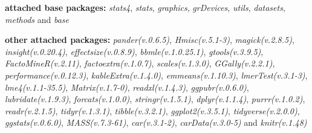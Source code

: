 \documentclass[
  bookmarksnumbered]{article}
\begin{document}
\textbf{attached base packages:}
\emph{stats4}, \emph{stats}, \emph{graphics}, \emph{grDevices}, \emph{utils}, \emph{datasets}, \emph{methods} and \emph{base}

\textbf{other attached packages:}
\emph{pander(v.0.6.5)}, \emph{Hmisc(v.5.1-3)}, \emph{magick(v.2.8.5)}, \emph{insight(v.0.20.4)}, \emph{effectsize(v.0.8.9)}, \emph{bbmle(v.1.0.25.1)}, \emph{gtools(v.3.9.5)}, \emph{FactoMineR(v.2.11)}, \emph{factoextra(v.1.0.7)}, \emph{scales(v.1.3.0)}, \emph{GGally(v.2.2.1)}, \emph{performance(v.0.12.3)}, \emph{kableExtra(v.1.4.0)}, \emph{emmeans(v.1.10.3)}, \emph{lmerTest(v.3.1-3)}, \emph{lme4(v.1.1-35.5)}, \emph{Matrix(v.1.7-0)}, \emph{readxl(v.1.4.3)}, \emph{ggpubr(v.0.6.0)}, \emph{lubridate(v.1.9.3)}, \emph{forcats(v.1.0.0)}, \emph{stringr(v.1.5.1)}, \emph{dplyr(v.1.1.4)}, \emph{purrr(v.1.0.2)}, \emph{readr(v.2.1.5)}, \emph{tidyr(v.1.3.1)}, \emph{tibble(v.3.2.1)}, \emph{ggplot2(v.3.5.1)}, \emph{tidyverse(v.2.0.0)}, \emph{ggstats(v.0.6.0)}, \emph{MASS(v.7.3-61)}, \emph{car(v.3.1-2)}, \emph{carData(v.3.0-5)} and \emph{knitr(v.1.48)}
\end{document}
